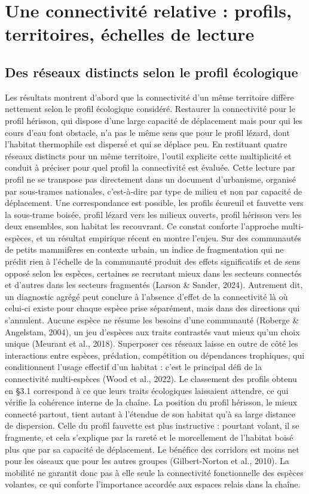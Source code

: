 \documentclass[a4paper,12pt]{report}
\begin{document}
\section{Une connectivité relative : profils, territoires, échelles de lecture}
\subsection{Des réseaux distincts selon le profil écologique}
Les résultats montrent d'abord que la connectivité d'un même territoire diffère nettement selon le profil écologique considéré. Restaurer la connectivité pour le profil hérisson, qui dispose d'une large capacité de déplacement mais pour qui les cours d'eau font obstacle, n'a pas le même sens que pour le profil lézard, dont l'habitat thermophile est dispersé et qui se déplace peu. En restituant quatre réseaux distincts pour un même territoire, l'outil explicite cette multiplicité et conduit à préciser pour quel profil la connectivité est évaluée. Cette lecture par profil ne se transpose pas directement dans un document d'urbanisme, organisé par sous-trames nationales, c'est-à-dire par type de milieu et non par capacité de déplacement. Une correspondance est possible, les profils écureuil et fauvette vers la sous-trame boisée, profil lézard vers les milieux ouverts, profil hérisson vers les deux ensembles, son habitat les recouvrant. Ce constat conforte l'approche multi-espèces, et un résultat empirique récent en montre l'enjeu. Sur des communautés de petits mammifères en contexte urbain, un indice de fragmentation qui ne prédit rien à l'échelle de la communauté produit des effets significatifs et de sens opposé selon les espèces, certaines se recrutant mieux dans les secteurs connectés et d'autres dans les secteurs fragmentés (Larson \& Sander, 2024). Autrement dit, un diagnostic agrégé peut conclure à l'absence d'effet de la connectivité là où celui-ci existe pour chaque espèce prise séparément, mais dans des directions qui s'annulent. Aucune espèce ne résume les besoins d'une communauté (Roberge \& Angelstam, 2004), un jeu d'espèces aux traits contrastés vaut mieux qu'un choix unique (Meurant et al., 2018). Superposer ces réseaux laisse en outre de côté les interactions entre espèces, prédation, compétition ou dépendances trophiques, qui conditionnent l'usage effectif d'un habitat : c'est le principal défi de la connectivité multi-espèces (Wood et al., 2022). Le classement des profils obtenu en §3.1 correspond à ce que leurs traits écologiques laissaient attendre, ce qui vérifie la cohérence interne de la chaîne. La position du profil hérisson, le mieux connecté partout, tient autant à l'étendue de son habitat qu'à sa large distance de dispersion. Celle du profil fauvette est plus instructive : pourtant volant, il se fragmente, et cela s'explique par la rareté et le morcellement de l'habitat boisé plus que par sa capacité de déplacement. Le bénéfice des corridors est moins net pour les oiseaux que pour les autres groupes (Gilbert-Norton et al., 2010). La mobilité ne garantit donc pas à elle seule la connectivité fonctionnelle des espèces volantes, ce qui conforte l'importance accordée aux espaces relais dans la chaîne.
\end{document}
